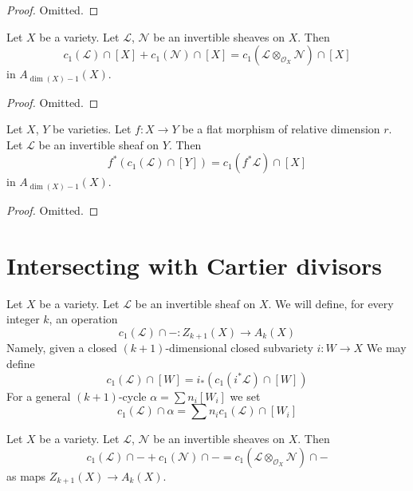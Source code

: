 \begin{proof}
Omitted.
\end{proof}

\begin{lemma}
\label{lemma-c1-additive}
Let $X$ be a variety.
Let $\mathcal{L}$, $\mathcal{N}$ be an invertible sheaves on $X$.
Then
$$
c_1(\mathcal{L}) \cap [X] + c_1(\mathcal{N}) \cap [X] =
c_1(\mathcal{L} \otimes_{\mathcal{O}_X} \mathcal{N}) \cap [X]
$$
in $A_{\dim(X) - 1}(X)$.
\end{lemma}

\begin{proof}
Omitted.
\end{proof}

\begin{lemma}
\label{lemma-flat-pullback-divisor-invertible-sheaf}
Let $X$, $Y$ be varieties. Let $f : X \to Y$ be a flat morphism of
relative dimension $r$. Let $\mathcal{L}$ be an invertible sheaf on $Y$.
Then
$$
f^*(c_1(\mathcal{L}) \cap [Y]) = c_1(f^*\mathcal{L}) \cap [X]
$$
in $A_{\dim(X) - 1}(X)$.
\end{lemma}

\begin{proof}
Omitted.
\end{proof}



\section{Intersecting with Cartier divisors}
\label{section-intersecting-with-divisors}

\noindent
Let $X$ be a variety. Let $\mathcal{L}$ be an invertible sheaf on $X$.
We will define, for every integer $k$, an operation
$$
c_1(\mathcal{L}) \cap - :
Z_{k + 1}(X) \to A_k(X)
$$
Namely, given a closed $(k + 1)$-dimensional closed subvariety $i : W \to X$
We may define
$$
c_1(\mathcal{L}) \cap [W] = i_*(c_1({i^*\mathcal{L}}) \cap [W])
$$
For a general $(k + 1)$-cycle $\alpha = \sum n_i [W_i]$ we set
$$
c_1(\mathcal{L}) \cap \alpha = \sum n_i c_1(\mathcal{L}) \cap [W_i]
$$

\begin{lemma}
\label{lemma-c1-cap-additive}
Let $X$ be a variety.
Let $\mathcal{L}$, $\mathcal{N}$ be an invertible sheaves on $X$.
Then
$$
c_1(\mathcal{L}) \cap -  + c_1(\mathcal{N}) \cap - =
c_1(\mathcal{L} \otimes_{\mathcal{O}_X} \mathcal{N}) \cap -
$$
as maps $Z_{k + 1}(X) \to A_k(X)$.
\end{lemma}

